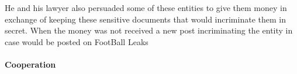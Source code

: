 He and his lawyer also persuaded some of these entities to give them money in exchange of keeping these sensitive documents that would incriminate them in secret.
When the money was not received a new post incriminating the entity in case would be posted on FootBall Leaks



\paragraph{Cooperation}

